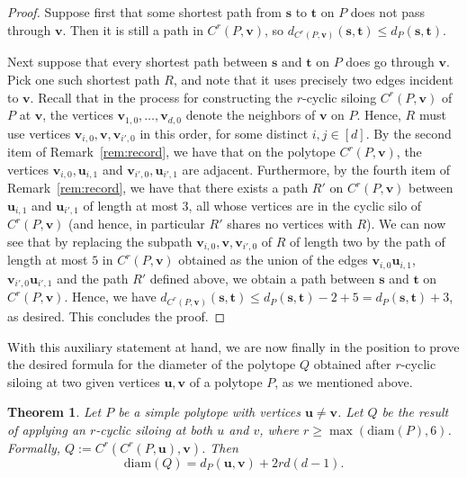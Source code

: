 \documentclass[centering,11pt,reqno]{amsart}
\newtheorem{theorem}{Theorem}[section]
\theoremstyle{definition}
\begin{document}
\begin{proof}
Suppose first that some shortest path from $\mathbf{s}$ to $\mathbf{t}$ on $P$ does not pass through $\mathbf{v}$. Then it is still a path in $C^r(P,\mathbf{v})$, so $d_{C^r(P,\mathbf{v})}(\mathbf{s},\mathbf{t}) \le d_{P}(\mathbf{s},\mathbf{t})$.

Next suppose that every shortest path between $\mathbf{s}$ and $\mathbf{t}$ on $P$ does go through $\mathbf{v}$. Pick one such shortest path $R$, and note that it uses precisely two edges incident to $\mathbf{v}$. Recall that in the process for constructing the $r$-cyclic siloing $C^r(P,\mathbf{v})$ of $P$ at $\mathbf{v}$, the vertices $\mathbf{v}_{1,0},\ldots,\mathbf{v}_{d,0}$ denote the neighbors of $\mathbf{v}$ on $P$. Hence, $R$ must use vertices $\mathbf{v}_{i,0},\mathbf{v},\mathbf{v}_{i',0}$ in this order, for some distinct $i,j\in [d]$. By the second item of Remark~\ref{rem:record}, we have that on the polytope $C^r(P,\mathbf{v})$, the vertices $\mathbf{v}_{i,0}, \mathbf{u}_{i,1}$ and $\mathbf{v}_{i',0}, \mathbf{u}_{i',1}$ are adjacent. Furthermore, by the fourth item of Remark~\ref{rem:record}, we have that there exists a path $R'$ on $C^r(P,\mathbf{v})$ between $\mathbf{u}_{i,1}$ and $\mathbf{u}_{i',1}$ of length at most $3$, all whose vertices are in the cyclic silo of $C^r(P,\mathbf{v})$ (and hence, in particular $R'$ shares no vertices with $R$). We can now see that by replacing the subpath $\mathbf{v}_{i,0},\mathbf{v},\mathbf{v}_{i',0}$ of $R$ of length two by the path of length at most $5$ in $C^r(P,\mathbf{v})$ obtained as the union of the edges $\mathbf{v}_{i,0}\mathbf{u}_{i,1}$, $\mathbf{v}_{i',0}\mathbf{u}_{i',1}$ and the path $R'$ defined above, we obtain a path between $\mathbf{s}$ and $\mathbf{t}$ on $C^r(P,\mathbf{v})$. Hence, we have $d_{C^r(P,\mathbf{v})}(\mathbf{s},\mathbf{t})\le d_P(\mathbf{s},\mathbf{t})-2+5=d_P(\mathbf{s},\mathbf{t})+3$, as desired. This concludes the proof.
\end{proof}

With this auxiliary statement at hand, we are now finally in the position to prove the desired formula for the diameter of the polytope $Q$ obtained after $r$-cyclic siloing at two given vertices $\mathbf{u}, \mathbf{v}$ of a polytope $P$, as we mentioned above.

\begin{theorem}\label{thm:diameterprecise}
Let $P$ be a simple polytope with vertices $\mathbf{u}\neq \mathbf{v}$. Let $Q$ be the result of applying an $r$-cyclic siloing at both $u$ and $v$, where $r \geq \max(\mathrm{diam}(P),6)$. Formally, $Q:=C^r(C^r(P,\mathbf{u}),\mathbf{v})$. Then
\[\mathrm{diam}(Q) = d_{P}(\mathbf{u},\mathbf{v}) + 2rd(d-1).\]
\end{theorem}
\end{document}
